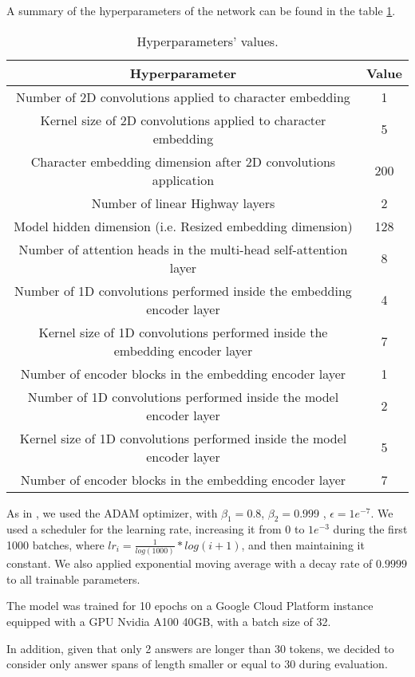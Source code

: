     A summary of the hyperparameters of the network can be found in the table \ref{table:hyperparameters}.

    \begin{table}
        \begin{tabular}{|c c|} 
            \hline
            Hyperparameter & Value \\
            \hline
            Number of 2D convolutions applied to character embedding & 1 \\ 
            Kernel size of 2D convolutions applied to character embedding & 5 \\
            Character embedding dimension after 2D convolutions application & 200 \\
            Number of linear Highway layers & 2 \\
            Model hidden dimension (i.e. Resized embedding dimension) & 128 \\
            Number of attention heads in the multi-head self-attention layer & 8 \\
            Number of 1D convolutions performed inside the embedding encoder layer & 4 \\
            Kernel size of 1D convolutions performed inside the embedding encoder layer & 7 \\
            Number of encoder blocks in the embedding encoder layer & 1 \\
            Number of 1D convolutions performed inside the model encoder layer & 2 \\
            Kernel size of 1D convolutions performed inside the model encoder layer & 5 \\
            Number of encoder blocks in the embedding encoder layer & 7 \\
            \hline
        \end{tabular}
        \caption{Hyperparameters' values.\label{table:hyperparameters}}
    \end{table}

    \vspace{0.5cm}

    As in \cite{yu2018qanet}, we used the ADAM optimizer\cite{kingma2017adam}, with $\beta_{1} = 0.8$, $\beta_{2} = 0.999$ , $\epsilon = 1e^{-7}$. 
    We used a scheduler for the learning rate, increasing it from $0$ to $1e^{-3}$ during the first 1000 batches, 
    where $lr_{i} = \frac{1}{log(1000)} * log(i+1)$, and then maintaining it constant.
    We also applied exponential moving average with a decay rate of $0.9999$ to all trainable parameters.

    The model was trained for 10 epochs on a Google Cloud Platform instance equipped with a GPU Nvidia A100 40GB, with a batch size of 32.

    In addition, given that only 2 answers are longer than 30 tokens, we decided to consider only answer spans of length smaller or equal to $30$ during evaluation.
